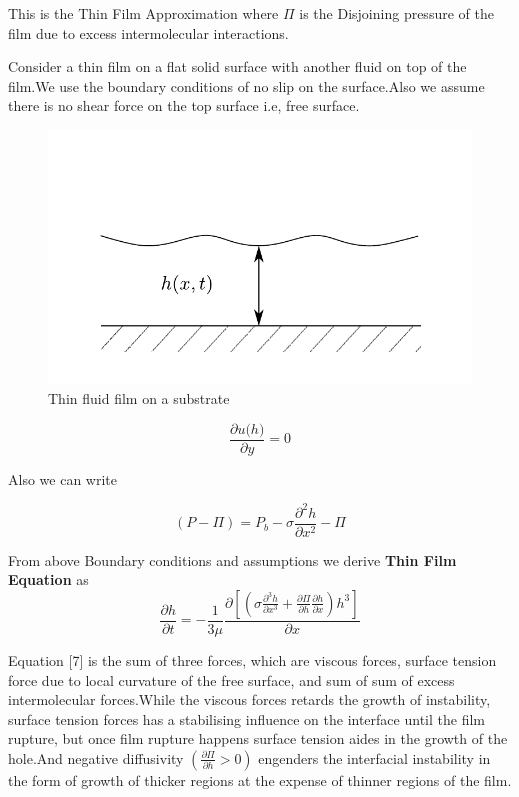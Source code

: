 \documentclass[
manuscript=article]{achemso}
\begin{document}
This  is the Thin Film Approximation where $ \Pi $    is the Disjoining pressure of the film due to excess intermolecular interactions.

Consider a thin film on a flat solid surface with another fluid on top of the film.We use the boundary conditions of no slip on the surface.Also we assume there is no shear force on the top surface i.e, free 
surface.

\begin{center}
  \begin{figure}[h]
 \includegraphics[]{Bubble_impinge.pdf}
 \caption{Thin fluid film on a substrate} \label{fig:impinge}
\end{figure}
\end{center}

\begin{equation}
\frac{\partial{u\Big(h\Big)}}{\partial{y}} = 0
\end{equation}


Also we can write

\begin{equation}
\left( P - \Pi \right) = P _{b} - \sigma \frac{\partial^2{h}}{\partial{x^{2}}} - \Pi
\end{equation}


From above Boundary conditions and assumptions we derive \textbf{Thin Film Equation} as 
\begin{equation}
\frac{\partial{h}}{\partial{t}} = - \frac{1}{3\mu}\frac{\partial \left[  \left(   \sigma\frac{\partial^3{h}}{\partial{x^{3}}}+\frac{\partial{\Pi}}{\partial{h}}\frac{\partial{h}}{\partial{x}}\right)h^{3}\right]}{\partial{x}}
\end{equation} 

Equation [7] is the sum of three forces, which are viscous forces, surface tension force due to local curvature of the free surface, and sum of sum of excess intermolecular forces.While the viscous forces retards the growth of instability, surface tension forces has a stabilising influence on the interface until the film rupture, but once film rupture happens surface tension aides in the growth of the hole.And  negative diffusivity
$ ( \frac{\partial{\Pi}}{\partial{h}} > 0 ) $
engenders the interfacial instability in the form of growth of thicker regions at the expense of thinner regions of the film.
\end{document}
